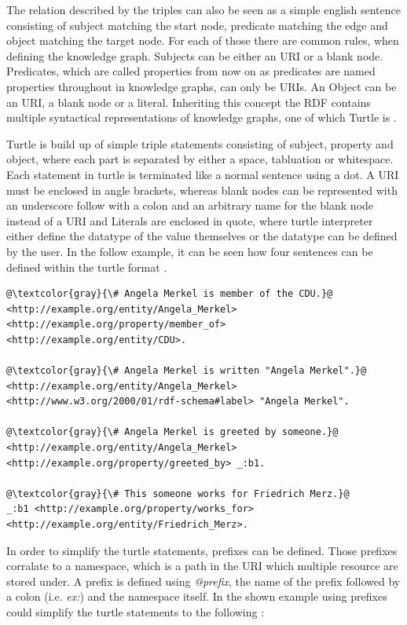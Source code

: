 \documentclass[a4paper,oneside,bibliography=totoc]{scrbook}
\begin{document}
The relation described by the triples can also be seen as a simple english sentence consisting of subject matching the start node, predicate matching the edge and object matching the target node. For each of those there are common rules, when defining the knowledge graph. Subjects can be either an \ac{URI} or a blank node. Predicates, which are called properties from now on as predicates are named properties throughout in knowledge graphs, can only be \acp{URI}. An Object can be an \ac{URI}, a blank node or a literal. Inheriting this concept the \ac{RDF} contains multiple syntactical representations of knowledge graphs, one of which Turtle is \cite{VillazonTerrazas2017}.

Turtle is build up of simple triple statements consisting of subject, property and object, where each part is separated by either a space, tabluation or whitespace. Each statement in turtle is terminated like a normal sentence using a dot. A \ac{URI} must be enclosed in angle brackets, whereas blank nodes can be represented with an underscore follow with a colon and an arbitrary name for the blank node instead of a \ac{URI} and Literals are enclosed in quote, where turtle interpreter either define the datatype of the value themselves or the datatype can be defined by the user. In the follow example, it can be seen how four sentences can be defined within the turtle format \cite{Tomaszuk2020}.


\begin{lstlisting}[language=Turtle, caption=Example of a Knowledge Graph in Turtle Format, label=lst:turtle_example, escapechar=@]
@\textcolor{gray}{\# Angela Merkel is member of the CDU.}@
<http://example.org/entity/Angela_Merkel> <http://example.org/property/member_of> <http://example.org/entity/CDU>.

@\textcolor{gray}{\# Angela Merkel is written "Angela Merkel".}@
<http://example.org/entity/Angela_Merkel> <http://www.w3.org/2000/01/rdf-schema#label> "Angela Merkel".

@\textcolor{gray}{\# Angela Merkel is greeted by someone.}@
<http://example.org/entity/Angela_Merkel> <http://example.org/property/greeted_by> _:b1.

@\textcolor{gray}{\# This someone works for Friedrich Merz.}@
_:b1 <http://example.org/property/works_for> <http://example.org/entity/Friedrich_Merz>.
\end{lstlisting}

In order to simplify the turtle statements, prefixes can be defined. Those prefixes corralate to a namespace, which is a path in the \ac{URI} which multiple resource are stored under. A prefix is defined using \textit{@prefix}, the name of the prefix followed by a colon (i.e. \textit{ex:}) and the namespace itself. In the shown example using prefixes could simplify the turtle statements to the following \cite{Tomaszuk2020}:
\end{document}
